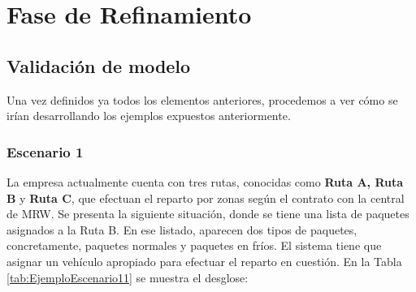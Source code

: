\section{Fase de Refinamiento}

\subsection{Validación de modelo}

Una vez definidos ya todos los elementos anteriores, procedemos a ver cómo se irían desarrollando los ejemplos expuestos anteriormente.

\subsubsection{Escenario 1}

La empresa actualmente cuenta con tres rutas, conocidas como \textbf{Ruta A, Ruta B} y \textbf{Ruta C}, que efectuan el reparto por zonas según el contrato con la central de MRW. Se presenta la siguiente situación, donde se tiene una lista de paquetes asignados a la Ruta B. En ese listado, aparecen dos tipos de paquetes, concretamente, paquetes normales y paquetes en fríos. El sistema tiene que asignar un vehículo apropiado para efectuar el reparto en cuestión. En la Tabla \ref{tab:EjemploEscenario11} se muestra el desglose:

